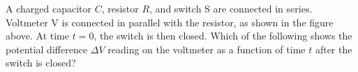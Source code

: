 \begin{questions}\setcounter{question}{24}\question
A charged capacitor $C$, resistor $R$, and switch S are connected in series. Voltmeter V is connected in parallel with the resistor, as shown in the figure above. At time $t=0$, the switch is then closed.
Which of the following shows the potential difference $\Delta V$ reading on the voltmeter as a function of time $t$ after the switch is closed?

\begin{oneparchoices}
    \choice {}
    \choice {}
    \choice {}

\end{oneparchoices}
\end{questions}
